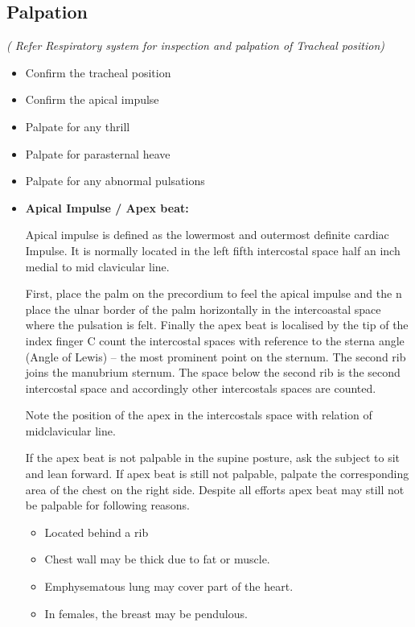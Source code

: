\documentclass[a4paper,12pt]{book}
\begin{document}
\subsection*{Palpation}

\emph{( Refer Respiratory system for inspection and palpation of Tracheal position)}
\begin{itemize}
\item{Confirm the tracheal position}
\item{Confirm the apical impulse}
\item{Palpate for any thrill}
\item{Palpate for parasternal heave}
\item{Palpate for any abnormal pulsations}
\item{\textbf{Apical Impulse / Apex beat:}
	\par
	Apical impulse is defined as the lowermost and outermost definite cardiac Impulse. It is normally located in the left fifth intercostal space half an inch medial to mid clavicular line.
	\par
	First, place the palm on the precordium to feel the apical impulse and the n place the ulnar border of the palm horizontally in the intercoastal space where the pulsation is felt. Finally the apex beat is localised by the tip of the index finger C count the intercostal spaces with reference to the sterna angle (Angle of Lewis) – the most prominent point on the sternum. The second rib joins the manubrium sternum. The space below the second rib is the second intercostal space and accordingly other intercostals spaces are counted. 
	\par
	Note the position of the apex in the intercostals space with relation of midclavicular line.
	\par
	If the apex beat is not palpable in the supine posture, ask the subject to sit and lean forward. If apex beat is still not palpable, palpate the corresponding area of the chest on the right side. Despite all efforts apex beat may still not be palpable for following reasons.
	\begin{itemize}
\item{ Located behind a rib}
\item{ Chest wall may be thick due to fat or muscle.}
\item{ Emphysematous lung may cover part of the heart.}
\item{ In females, the breast may be pendulous.}
	\end{itemize}
	\par
}
\end{itemize}
\end{document}
